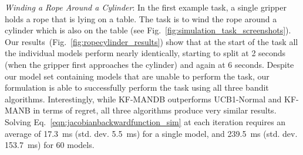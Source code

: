 \textit{Winding a Rope Around a Cylinder}: In the first example task, a single gripper holds a rope that is lying on a table. The task is to wind the rope around a cylinder which is also on the table (see Fig.~\ref{fig:simulation_task_screenshots}). Our results~(Fig.~\ref{fig:ropecylinder_results}) show that at the start of the task all the individual models perform nearly identically, starting to split at 2 seconds (when the gripper first approaches the cylinder) and again at 6 seconds. Despite our model set containing models that are unable to perform the task, our formulation is able to successfully perform the task using all three bandit algorithms. Interestingly, while KF-MANDB outperforms UCB1-Normal and KF-MANB in terms of regret, all three algorithms produce very similar results. Solving Eq.~\eqref{eqn:jacobianbackwardfunction_sim} at each iteration requires an average of 17.3~ms (std. dev. 5.5~ms) for a single model, and 239.5~ms (std. dev. 153.7~ms) for 60 models.


\begin{figure*}[t]
    \centering
    \vspace{-0.1in}
    \\
    \vspace{-0.15in}
    \vspace{-0.1in}
    \caption{Experimental results for the rope-winding task. Top left: alignment error for 10 trials for each MAB algorithm, and each model in the model set when used in isolation. UCB1-Normal, KF-MANB, KF-MANDB lines overlap in the figure for all trials. Top right: Total regret averaged across 10 trials for each MAB algorithm with the minimum and maximum drawn in dashed lines. Bottom row: histograms of the number of times each model was selected by each MAB algorithm; UCB1-Normal (bl), KF-MANB (bm), KF-MANDB (br).}
    \label{fig:ropecylinder_results}
\end{figure*}



